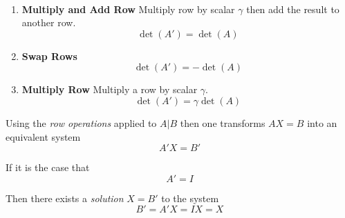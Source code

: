 \begin{definition}\ \\
    \begin{enumerate}
        \item \textbf{Multiply and Add Row}
            \subitem Multiply row by scalar $\gamma$ then add the result to another row.
            \begin{equation}
                \det(A\prime) = \det(A)
            \end{equation}
        \item \textbf{Swap Rows}
            \begin{equation}
                \det(A\prime) = -\det(A)
            \end{equation}
        \item \textbf{Multiply Row}
            \subitem Multiply a row by scalar $\gamma$.
            \begin{equation}
                \det(A\prime) = \gamma \det(A)
            \end{equation}
    \end{enumerate}
\end{definition}

\begin{definition}
    Using the \textit{row operations} applied to $A \vert B$ then one transforms $A X = B$ into an equivalent system
    \begin{equation}
        A\prime X = B\prime
    \end{equation}
    
    If it is the case that
    \begin{equation}
        A\prime = I
    \end{equation}
    
    Then there exists a \textit{solution} $X = B\prime$ to the system
    \begin{equation}
        B\prime = A\prime X = I X = X
    \end{equation}
\end{definition}

